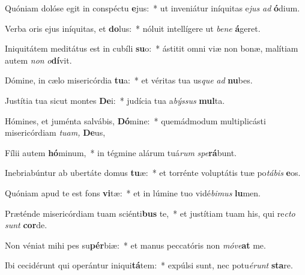\item Quóniam dolóse egit in conspéctu \textbf{e}jus:~* ut inveniátur iníquitas e\textit{jus} \textit{ad} \textbf{ó}dium.
\item Verba oris ejus iníquitas, et \textbf{do}lus:~* nóluit intellígere ut \textit{bene} \textbf{á}geret.
\item Iniquitátem meditátus est in cubíli \textbf{su}o:~* ástitit omni viæ non bonæ, malítiam autem \textit{non} \textit{o}\textbf{dí}vit.
\item Dómine, in cælo misericórdia \textbf{tu}a:~* et véritas tua us\tinyhspace\textit{que} \textit{ad} \textbf{nu}bes.
\item Justítia tua sicut montes \textbf{De}i:~* judícia tua a\tinyhspace\textit{býssus} \textbf{mul}ta.
\item Hómines, et juménta salvábis, \textbf{Dó}mine:~* quemádmodum multiplicásti misericórdiam \textit{tuam,} \textbf{De}us,
\item Fílii autem \textbf{hó}minum,~* in tégmine alárum tuá\tinyhspace\textit{rum} \textit{spe}\textbf{rá}bunt.
\item Inebriabúntur ab ubertáte domus \textbf{tu}æ:~* et torrénte voluptátis tuæ po\textit{tábis} \textbf{e}os.
\item Quóniam apud te est fons \textbf{vi}tæ:~* et in lúmine tuo vidé\textit{bimus} \textbf{lu}men.
\item Præténde misericórdiam tuam sciénti\textbf{bus} te,~* et justítiam tuam his, qui re\hspace*{0.01em}\textit{cto} \textit{sunt} \textbf{cor}de.
\item Non véniat mihi pes su\textbf{pér}biæ:~* et manus peccatóris non \textit{móve}\textbf{at} me.
\item Ibi cecidérunt qui operántur iniqui\textbf{tá}tem:~* expúlsi sunt, nec potu\tinyhspace\textit{érunt} \textbf{sta}re.
